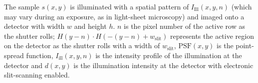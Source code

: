 The sample \(s(x,y)\) is illuminated with a spatial pattern of \(I_{\text{Ill}}(x,y,n)\) (which may vary during an exposure, as in \gls{light-sheet} microscopy) and imaged onto a detector with width \(w\) and height \(h\).
\(n\) is the pixel number of the active row as the shutter rolls; \(H(y-n) \cdot H(-(y-n)+w_{\text{slit}})\) represents the active region on the detector as the shutter rolls with a width of \(w_{\text{slit}}\), \(\text{PSF}(x,y)\) is the point-spread function, \(I_{\text{ill}}(x,y,n)\) is the intensity profile of the illumination at the detector and \(d(x,y)\) is the illumination intensity at the detector with electronic slit-scanning enabled.
